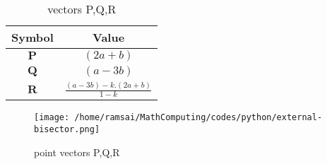 \documentclass{article}
\let\vec\mathbf
\begin{document}
\begin{table}[h]
    \centering
    \begin{tabular}{|c|c|}
        \hline
        \textbf{Symbol} & \textbf{Value} \\
        \hline
        $\vec{P}$ & $(2a+b)$ \\
        \hline
        $\vec{Q}$ & $(a-3b)$ \\
        \hline
        $\vec{R}$ & $\frac{(a-3b)-k.(2a+b)}{1-k}$ \\
        \hline
    \end{tabular}
    \label{tab:mytable}
    \caption{vectors P,Q,R}
\end{table}
\begin{figure}[!ht]
    \centering
    \texttt{[image: /home/ramsai/MathComputing/codes/python/external-bisector.png]}
    \caption{point vectors P,Q,R}
    \label{fig:enter-label}
\end{figure}
\end{document}
